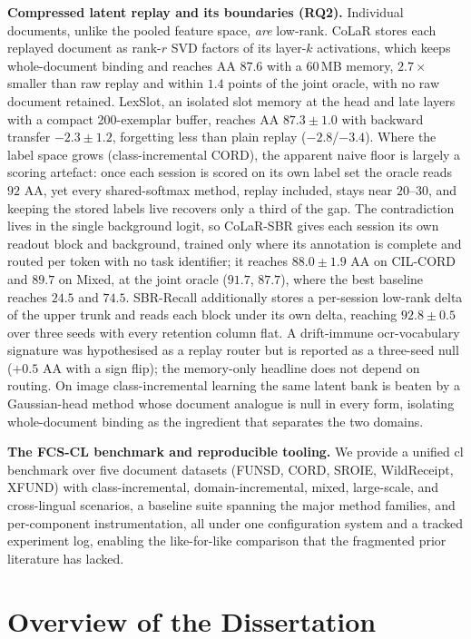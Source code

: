 \noindent\textbf{Compressed latent replay and its boundaries (RQ2).} Individual documents, unlike the pooled
feature space, \emph{are} low-rank. CoLaR stores each replayed document as rank-$r$ SVD factors
of its layer-$k$ activations, which keeps whole-document binding and reaches AA $87.6$ with a
$60$\,MB memory, $2.7\times$ smaller than raw replay and within $1.4$ points of the joint
oracle, with no raw document retained. LexSlot, an isolated slot memory at the head and late
layers with a compact 200-exemplar buffer, reaches AA $87.3 \pm 1.0$ with
backward transfer $-2.3 \pm 1.2$, forgetting less than plain
replay ($-2.8$/$-3.4$). Where the label space grows (class-incremental CORD),
the apparent naive floor is largely a scoring artefact: once each session is scored on its own
label set the oracle reads $92$ AA, yet every shared-softmax method, replay included, stays
near $20$--$30$, and keeping the stored labels live recovers only a third of the gap. The
contradiction lives in the single background logit, so CoLaR-SBR gives each session its own
readout block and background, trained only where its annotation is complete and routed per
token with no task identifier; it reaches $88.0\pm1.9$ AA on CIL-CORD and $89.7$ on Mixed, at
the joint oracle ($91.7$, $87.7$), where the best baseline reaches $24.5$ and $74.5$. SBR-Recall
additionally stores a per-session low-rank delta of the upper trunk and reads each block under
its own delta, reaching $92.8\pm0.5$ over three seeds with every retention column flat. A drift-immune
\gls{ocr}-vocabulary signature was hypothesised as a replay router but is reported as a
three-seed null ($+0.5$ AA with a sign flip); the memory-only headline does not depend on
routing. On image class-incremental learning the same latent bank is beaten by a Gaussian-head
method whose document analogue is null in every form, isolating whole-document binding as the
ingredient that separates the two domains.

\noindent\textbf{The FCS-CL benchmark and reproducible tooling.} We provide a unified \gls{cl}
benchmark over five document datasets (FUNSD, CORD, SROIE, WildReceipt, XFUND) with
class-incremental, domain-incremental, mixed, large-scale, and cross-lingual scenarios, a
baseline suite spanning the major method families, and per-component instrumentation, all
under one configuration system and a tracked experiment log, enabling the like-for-like
comparison that the fragmented prior literature has lacked.

\section{Overview of the Dissertation}
\label{sec:intro-overview}

